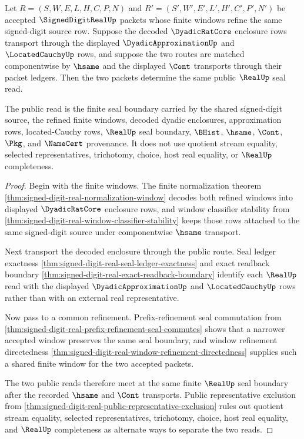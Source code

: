 \begin{theorem}
\label{thm:signed-digit-real-public-refinement-consistency}
Let $R=(S,W,E,L,H,C,P,N)$ and $R'=(S',W',E',L',H',C',P',N')$ be accepted $\SignedDigitRealUp$ packets whose finite windows refine the same signed-digit source row. Suppose the decoded $\DyadicRatCore$ enclosure rows transport through the displayed $\DyadicApproximationUp$ and $\LocatedCauchyUp$ rows, and suppose the two routes are matched componentwise by $\hsame$ and the displayed $\Cont$ transports through their packet ledgers. Then the two packets determine the same public $\RealUp$ seal read.

The public read is the finite seal boundary carried by the shared signed-digit source, the refined finite windows, decoded dyadic enclosures, approximation rows, located-Cauchy rows, $\RealUp$ seal boundary, $\BHist$, $\hsame$, $\Cont$, $\Pkg$, and $\NameCert$ provenance. It does not use quotient stream equality, selected representatives, trichotomy, choice, host real equality, or $\RealUp$ completeness.
\end{theorem}
\begin{proof}
Begin with the finite windows. The finite normalization theorem \autoref{thm:signed-digit-real-normalization-window} decodes both refined windows into displayed $\DyadicRatCore$ enclosure rows, and window classifier stability from \autoref{thm:signed-digit-real-window-classifier-stability} keeps those rows attached to the same signed-digit source under componentwise $\hsame$ transport.

Next transport the decoded enclosure through the public route. Seal ledger exactness \autoref{thm:signed-digit-real-seal-ledger-exactness} and exact readback boundary \autoref{thm:signed-digit-real-exact-readback-boundary} identify each $\RealUp$ read with the displayed $\DyadicApproximationUp$ and $\LocatedCauchyUp$ rows rather than with an external real representative.

Now pass to a common refinement. Prefix-refinement seal commutation from \autoref{thm:signed-digit-real-prefix-refinement-seal-commutes} shows that a narrower accepted window preserves the same seal boundary, and window refinement directedness \autoref{thm:signed-digit-real-window-refinement-directedness} supplies such a shared finite window for the two accepted packets.

The two public reads therefore meet at the same finite $\RealUp$ seal boundary after the recorded $\hsame$ and $\Cont$ transports. Public representative exclusion from \autoref{thm:signed-digit-real-public-representative-exclusion} rules out quotient stream equality, selected representatives, trichotomy, choice, host real equality, and $\RealUp$ completeness as alternate ways to separate the two reads.
\end{proof}

